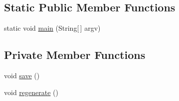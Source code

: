 \subsection*{Static Public Member Functions}
\begin{DoxyCompactItemize}
\item 
static void \mbox{\hyperlink{classorg_1_1newdawn_1_1slick_1_1tools_1_1packulike_1_1_packer_ab4b9f50874989c58b4f344f9747fd04d}{main}} (String\mbox{[}$\,$\mbox{]} argv)
\end{DoxyCompactItemize}
\subsection*{Private Member Functions}
\begin{DoxyCompactItemize}
\item 
void \mbox{\hyperlink{classorg_1_1newdawn_1_1slick_1_1tools_1_1packulike_1_1_packer_ae1d601f21decc14ffa54fa8d6926f971}{save}} ()
\item 
void \mbox{\hyperlink{classorg_1_1newdawn_1_1slick_1_1tools_1_1packulike_1_1_packer_a7350e349de07dff645d4e146eef9f100}{regenerate}} ()
\end{DoxyCompactItemize}
